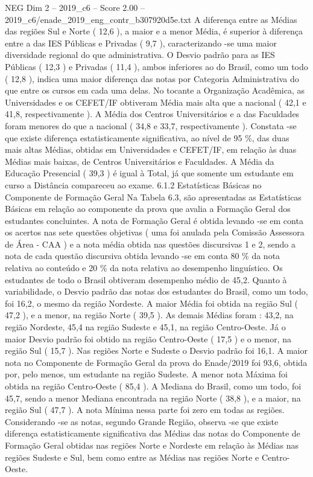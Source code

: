 \begin{textsample}{NEG Dim 2 – 2019\_c6 – Score 2.00 – 2019\_c6/enade\_2019\_eng\_contr\_b307920d5e.txt}
A diferença entre as Médias das regiões Sul e Norte ( 12,6 ), a maior e a menor Média, é superior à diferença entre a das IES Públicas e Privadas ( 9,7 ), caracterizando -se uma maior diversidade regional do que administrativa.
O Desvio padrão para as IES Públicas ( 12,3 ) e Privadas ( 11,4 ), ambos inferiores ao do Brasil, como um todo ( 12,8 ), indica uma maior diferença das notas por Categoria Administrativa do que entre os cursos em cada uma delas.
No tocante a Organização Acadêmica, as Universidades e os CEFET/IF obtiveram Média mais alta que a nacional ( 42,1 e 41,8, respectivamente ).
A Média dos Centros Universitários e a das Faculdades foram menores do que a nacional ( 34,8 e 33,7, respectivamente ).
Constata -se que existe diferença estatisticamente significativa, ao nível de 95 \%, das duas mais altas Médias, obtidas em Universidades e CEFET/IF, em relação às duas Médias mais baixas, de Centros Universitários e Faculdades.
A Média da Educação Presencial ( 39,3 ) é igual à Total, já que somente um estudante em curso a Distância compareceu ao exame. 6.1.2 Estatísticas Básicas no Componente de Formação Geral Na Tabela 6.3, são apresentadas as Estatísticas Básicas em relação ao componente da prova que avalia a Formação Geral dos estudantes concluintes.
A nota de Formação Geral é obtida levando -se em conta os acertos nas sete questões objetivas ( uma foi anulada pela Comissão Assessora de Área - CAA ) e a nota média obtida nas questões discursivas 1 e 2, sendo a nota de cada questão discursiva obtida levando -se em conta 80 \% da nota relativa ao conteúdo e 20 \% da nota relativa ao desempenho linguístico.
Os estudantes de todo o Brasil obtiveram desempenho médio de 45,2.
Quanto à variabilidade, o Desvio padrão das notas dos estudantes do Brasil, como um todo, foi 16,2, o mesmo da região Nordeste.
A maior Média foi obtida na região Sul ( 47,2 ), e a menor, na região Norte ( 39,5 ).
As demais Médias foram : 43,2, na região Nordeste, 45,4 na região Sudeste e 45,1, na região Centro-Oeste.
Já o maior Desvio padrão foi obtido na região Centro-Oeste ( 17,5 ) e o menor, na região Sul ( 15,7 ).
Nas regiões Norte e Sudeste o Desvio padrão foi 16,1.
A maior nota no Componente de Formação Geral da prova do Enade/2019 foi 93,6, obtida por, pelo menos, um estudante na região Sudeste.
A menor nota Máxima foi obtida na região Centro-Oeste ( 85,4 ).
A Mediana do Brasil, como um todo, foi 45,7, sendo a menor Mediana encontrada na região Norte ( 38,8 ), e a maior, na região Sul ( 47,7 ).
A nota Mínima nessa parte foi zero em todas as regiões.
Considerando -se as notas, segundo Grande Região, observa -se que existe diferença estatisticamente significativa das Médias das notas do Componente de Formação Geral obtidas nas regiões Norte e Nordeste em relação às Médias nas regiões Sudeste e Sul, bem como entre as Médias nas regiões Norte e Centro-Oeste.

\end{textsample}
